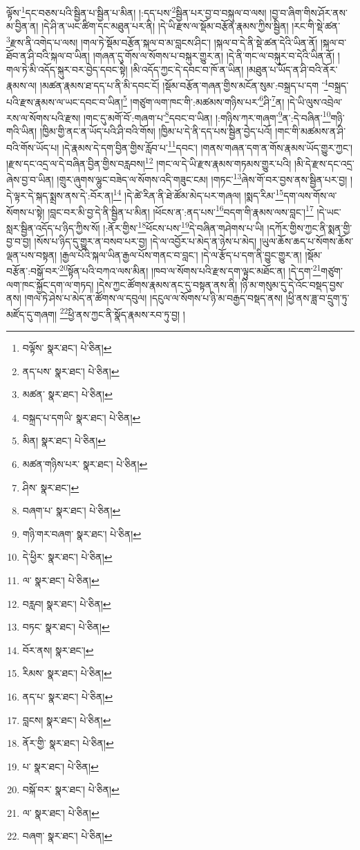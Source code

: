 ལྟོས་\footnote{བལྟོས་  སྣར་ཐང་།  པེ་ཅིན། }དང་བཅས་པའི་སྦྱིན་པ་སྦྱིན་པ་མིན། །:དད་པས་\footnote{ནད་པས་  སྣར་ཐང་།  པེ་ཅིན། }སྦྱིན་པར་བྱ་བ་བསྐུལ་བ་ལས། །བྱ་བ་ཞིག་གིས་ཤོར་ནས་མ་བྱིན་ན། །དེ་ཤི་ན་ཡང་ཚིག་དང་མཐུན་པར་ནི། །དེ་ཡི་རྫས་ལ་སྡོམ་བརྩོན་རྣམས་ཀྱིས་སྦྱིན། །རང་གི་སྡེ་ཚན་\footnote{མཚན་  སྣར་ཐང་།  པེ་ཅིན། }རྫས་ནི་འགེད་པ་ལས། །གལ་ཏེ་སྡོམ་བརྩོན་སྐལ་བ་མ་བླངས་ཤིང་། །སྐལ་བ་དེ་ནི་སྡེ་ཚན་དེའི་ཡིན་ནོ། །སྐལ་བ་ཐོབ་ན་ཤི་བའི་སྐལ་བ་ཡིན། །གཞན་དུ་གོས་ལ་སོགས་པ་བསྐུར་གྱུར་ན། །དེ་ནི་གང་ལ་བསྐུར་བ་དེའི་ཡིན་ནོ། །གལ་ཏེ་མི་འདོད་སྐུར་བར་བྱེད་དབང་སྟེ། །མི་འདོད་ཀྱང་དེ་དབང་བ་ཁོ་ན་ཡིན། །མཐུན་པ་ཡོད་ན་ཤི་བའི་ནོར་རྣམས་ལ། །མཚན་རྣམས་ཐ་དད་པ་ནི་མི་དབང་ངོ། །སྡོམ་བརྩོན་གཞན་གྱིས་མངོན་སུམ་:བསྐྲད་པ་དག ་\footnote{བསྐྲད་པ་དགཡི་  སྣར་ཐང་།  པེ་ཅིན། }བསྐྲད་པའི་རྫས་རྣམས་ལ་ཡང་དབང་བ་ཡིན།\footnote{མིན།  སྣར་ཐང་།  པེ་ཅིན། } །གཙུག་ལག་ཁང་གི་:མཚམས་གཉིས་པར་\footnote{མཚན་གཉིས་པར་  སྣར་ཐང་།  པེ་ཅིན། }ཤི་\footnote{ཤིས་  སྣར་ཐང་། }ན། །དེ་ཡི་ལུས་འབྲེལ་རས་ལ་སོགས་པའི་རྫས། །གང་དུ་མགོ་བོ་:གཞག་པ་\footnote{བཞག་པ་  སྣར་ཐང་།  པེ་ཅིན། }དབང་བ་ཡིན། །:གཉིས་ཀར་གཞག་\footnote{གཉི་གར་བཞག་  སྣར་ཐང་།  པེ་ཅིན། }ན་:དེ་བཞིན་\footnote{དེ་ཕྱིར་  སྣར་ཐང་།  པེ་ཅིན། }གཉི་གའི་ཡིན། །ཁྱིམ་གྱི་ནང་ན་ཡོད་པའི་ཤི་བའི་གོས། །ཁྱིམ་པ་དེ་ནི་དད་པས་སྦྱིན་བྱེད་པའོ། །གང་གི་མཚམས་ན་ཤི་བའི་གོས་ཡོད་པ། །དེ་རྣམས་དེ་དག་བྱིན་གྱིས་རློབ་པ་\footnote{ལ་  སྣར་ཐང་།  པེ་ཅིན། }དབང་། །གནས་གཞན་དག་ན་གོས་རྣམས་ཡོད་གྱུར་ཀྱང་། །རྫས་དང་འདྲ་ལ་དེ་བཞིན་བྱིན་གྱིས་བརླབས།\footnote{བརླབ།  སྣར་ཐང་།  པེ་ཅིན། } །གང་ལ་དེ་ཡི་རྫས་རྣམས་གཏམས་གྱུར་པའི། །མི་དེ་རྫས་དང་འདྲ་ཞེས་བྱ་བ་ཡིན། །གྲུར་ཞུགས་ལྷུང་བཟེད་ལ་སོགས་འདི་གཟུང་ངམ། །གཏང་\footnote{བཏང་  སྣར་ཐང་།  པེ་ཅིན། }ཞེས་གོ་བར་བྱས་ནས་སྦྱིན་པར་བྱ། །དེ་ལྟར་དེ་སྐད་སྨྲས་ནས་དེ་:བོར་ན།\footnote{བོར་ནས།  སྣར་ཐང་། } །དེ་ཚེ་རིན་ནི་ཐེ་ཚོམ་མེད་པར་གཞལ། །སྨད་རིམ་\footnote{རིམས་  སྣར་ཐང་།  པེ་ཅིན། }དག་ལས་གོས་ལ་སོགས་པ་སྟེ། །བླང་བར་མི་བྱ་དེ་ནི་སྦྱིན་པ་མིན། །ཕོངས་ན་:ནད་པས་\footnote{ནད་པ་  སྣར་ཐང་།  པེ་ཅིན། }བདག་གི་རྣམས་ལས་བླང་།\footnote{བླངས།  སྣར་ཐང་།  པེ་ཅིན། } །དེ་ཡང་སླར་སྦྱིན་འདོད་པ་ཉིད་ཀྱིས་སོ། །:ནོར་གྱིས་\footnote{ནོར་གྱི་  སྣར་ཐང་།  པེ་ཅིན། }ཕོངས་པས་\footnote{པ་  སྣར་ཐང་།  པེ་ཅིན། }དེ་བཞིན་གཤེགས་པ་ཡི། །དཀོར་གྱིས་ཀྱང་ནི་སྨན་གྱི་བྱ་བ་བྱ། །སོས་པ་ཉིད་དུ་གྱུར་ན་བསབ་པར་བྱ། །དེ་ལ་འབྱོར་པ་མེད་ན་ཉེས་པ་མེད། །ཡུལ་ཆོས་ཆད་པ་སོགས་ཆོས་ལྡན་པས་བསྟན། །རྒྱལ་པོའི་སྐལ་ཡིན་རྒྱལ་པོས་གནང་བ་བླང་། །དེ་ལ་རྩོད་པ་དག་ནི་བྱུང་གྱུར་ན། །སྡོམ་བརྩོན་:བསྒོ་བར་\footnote{བསྐོ་བར་  སྣར་ཐང་།  པེ་ཅིན། }སྟོན་པའི་བཀའ་ལས་མིན། །ཁབ་ལ་སོགས་པའི་རྫས་དག་ལྟུང་མཐོང་ན། །དེ་དག་\footnote{ལ་  སྣར་ཐང་།  པེ་ཅིན། }གཙུག་ལག་ཁང་སྐྱོང་དག་ལ་གཏད། །དེས་ཀྱང་ཚོགས་རྣམས་ནང་དུ་བསྟན་ནས་ནི། །ཉི་མ་གསུམ་དུ་དེ་འོང་བསྡད་བྱས་ནས། །གལ་ཏེ་ཤེས་པ་མེད་ན་ཚོགས་ལ་དབུལ། །དངུལ་ལ་སོགས་པ་ཉི་མ་བརྒྱད་བསྡད་ནས། །ཕྱི་ནས་ཟླ་བ་དྲུག་ཏུ་མཛོད་དུ་གཞག། \footnote{བཞག་  སྣར་ཐང་།  པེ་ཅིན། }ཕྱི་ནས་ཀྱང་ནི་སྣོད་རྣམས་རབ་ཏུ་བྱ། །
